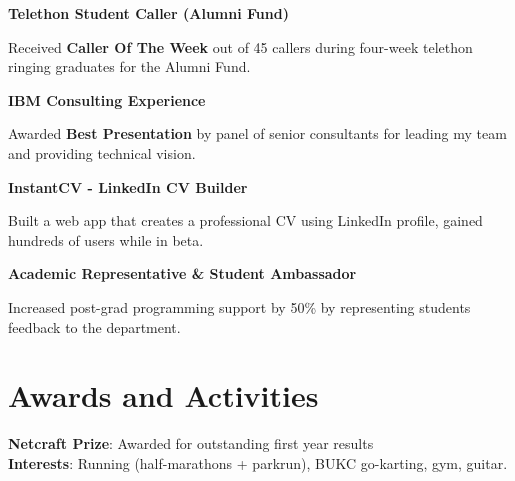 \documentclass[a4paper]{deedy-resume}
\begin{document}
\textbf{Telethon Student Caller (Alumni Fund)} \hfill{}
\begin{tightitemize}	
\item Received \textbf{Caller Of The Week} out of 45 callers during four-week telethon ringing graduates for the Alumni Fund.
\end{tightitemize}
\itemspace

\iffalse
\textbf{Consultant - Systematic Innovation} \hfill\mydate{Summer 2016}
\begin{tightitemize}	
	\item Shadowed world leading innovation consultancy at client sites including BAT and JLR, including TRIZ training.
\end{tightitemize}
\itemspace
\fi

\textbf{IBM Consulting Experience} \hfill{}
\begin{tightitemize}	
\item Awarded \textbf{Best Presentation} by panel of senior consultants for leading my team and providing technical vision. \end{tightitemize}
\itemspace

\textbf{InstantCV - LinkedIn CV Builder} \hfill{}
\begin{tightitemize}
\item Built a web app that creates a professional CV using LinkedIn profile, gained hundreds of users while in beta.
\end{tightitemize}
\itemspace

\textbf{Academic Representative \& Student Ambassador} \hfill{}
\begin{tightitemize}	\item Increased post-grad programming support by 50\% by representing students feedback to the department. \end{tightitemize}
\sectionspace

\section{Awards and Activities}
\normalfont
{}
\vspace{2 mm}


\textbf{Netcraft Prize}: Awarded for outstanding first year results \hfill{}\\
\vspace{0.7mm}
\textbf{Interests}: Running (half-marathons + parkrun), BUKC go-karting, gym, guitar.
\sectionspace
\end{document}
